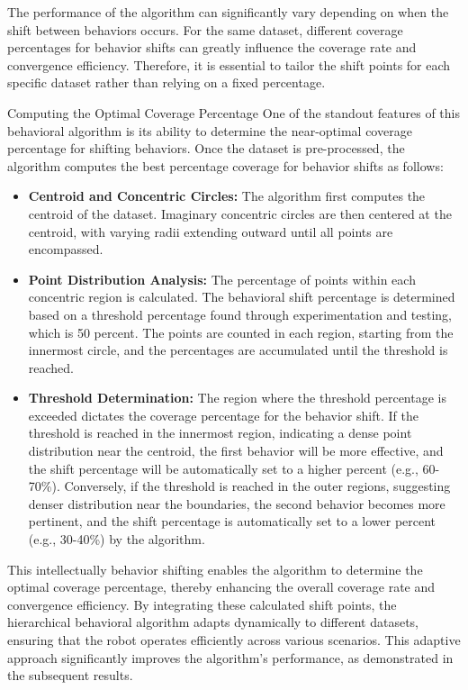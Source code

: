 The performance of the algorithm can significantly vary depending on when the shift between behaviors occurs. For the same dataset, different coverage percentages for behavior shifts can greatly influence the coverage rate and convergence efficiency. Therefore, it is essential to tailor the shift points for each specific dataset rather than relying on a fixed percentage.

\vspace*{6mm}   

Computing the Optimal Coverage Percentage
One of the standout features of this behavioral algorithm is its ability to determine the near-optimal coverage percentage for shifting behaviors. Once the dataset is pre-processed, the algorithm computes the best percentage coverage for behavior shifts as follows:

\begin{itemize}
    \item \textbf{Centroid and Concentric Circles:  }The algorithm first computes the centroid of the dataset. Imaginary concentric circles are then centered at the centroid, with varying radii extending outward until all points are encompassed.
    \item \textbf{Point Distribution Analysis:  }The percentage of points within each concentric region is calculated. The behavioral shift percentage is determined based on a threshold percentage found through experimentation and testing, which is 50 percent. The points are counted in each region, starting from the innermost circle, and the percentages are accumulated until the threshold is reached.
    \item \textbf{Threshold Determination:  }The region where the threshold percentage is exceeded dictates the coverage percentage for the behavior shift. If the threshold is reached in the innermost region, indicating a dense point distribution near the centroid, the first behavior will be more effective, and the shift percentage will be automatically set to a higher percent (e.g., 60-70\%). Conversely, if the threshold is reached in the outer regions, suggesting denser distribution near the boundaries, the second behavior becomes more pertinent, and the shift percentage is automatically set to a lower percent (e.g., 30-40\%) by the algorithm.
\end{itemize} 

\vspace*{6mm}   

This intellectually behavior shifting enables the algorithm to determine the optimal coverage percentage, thereby enhancing the overall coverage rate and convergence efficiency. By integrating these calculated shift points, the hierarchical behavioral algorithm adapts dynamically to different datasets, ensuring that the robot operates efficiently across various scenarios. This adaptive approach significantly improves the algorithm's performance, as demonstrated in the subsequent results.  

\vspace*{6mm}   

